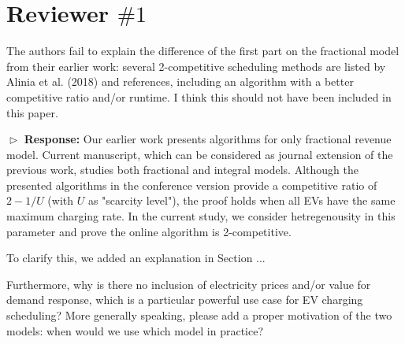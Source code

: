 \documentclass[11pt]{article}
\begin{document}
\newpage
\section{Reviewer $\# 1$}

{\color{blue} The authors fail to explain the difference of the first part on the fractional model from their earlier work: several 2-competitive scheduling methods are listed by Alinia et al. (2018) and references, including an algorithm with a better competitive ratio and/or runtime. I think this should not have been included in this paper. }
\vspace{3mm}

$\vartriangleright$ \noindent\textbf{Response:} 
Our earlier work presents algorithms for only fractional revenue model. Current manuscript, which can be considered as journal extension of the previous work, studies both fractional and integral models. Although the presented algorithms in the conference version provide a competitive ratio of $2-1/U$ (with $U$ as "scarcity level"), the proof holds when all EVs have the same maximum charging rate. In the current study, we consider hetregenousity in this parameter and prove the online algorithm is 2-competitive.

To clarify this, we added an explanation in Section ...   

\vspace{3mm}
{\color{blue} Furthermore, why is there no inclusion of electricity prices and/or value for demand response, which is a particular powerful use case for EV charging scheduling? More generally speaking, please add a proper motivation of the two models: when would we use which model in practice? }
\vspace{3mm}
\end{document}
